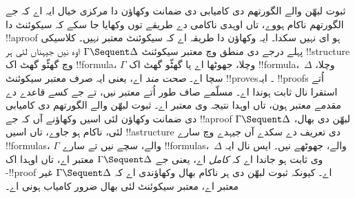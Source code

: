 \documentclass[../../../include/open-logic-section]{subfiles}
\begin{document}
ثبوت لبھّن والے الگورتھم دی کامیابی دی ضمانت وکھاؤن دا مرکزی خیال ایہ اے کہ جے الگورتھم ناکام ہووے، تاں اوہدی ناکامی دے طریقے توں وکھایا جا سکے کہ سیکوئنٹ دا !!a{proof} ہو ای نہیں سکدا۔ ایہ وکھاؤن دا طریقہ اے کہ سیکوئنٹ معتبر نہیں۔ کلاسیکی پہلے درجے دی منطق وچ معتبر سیکوئنٹ $ \Gamma \Sequent \Delta$ اوہ نیں جیہناں لئی ہر !!{structure} وچ گھٹّو گھٹ اک !!{formula}، $\Gamma$ وچلا، جھوٹھا اے یا گھٹّو گھٹ اک !!{formula}،~$\Delta$ وچلا، سچا اے۔  \emph{صحت مند} اے، یعنی ایہ صرف معتبر سیکوئنٹ !!{prove}s۔ ایہ !!{proof}s اُتے استقرا نال ثابت ہوندا اے۔ مسلّمے صاف طور اُتے معتبر نیں، تے جے کسے قاعدے دے مقدمے معتبر ہون، تاں اوہدا نتیجہ وی معتبر اے۔ ثبوت لبھّن والے الگورتھم دی کامیابی دی ضمانت وکھاؤن لئی اسیں وکھاؤنے آں کہ جے !!a{proof} لبھّن دی بھال، $\Gamma \Sequent \Delta$ لئی، ناکام ہو جاوے، تاں اسیں !!a{structure} دی تعریف دے سکدے آں جیہدے وچ سارے !!{formula}s، $\Gamma$ والے، سچے نیں تے سارے !!{formula}s،~$\Delta$ والے، جھوٹھے نیں۔ ایس نال ایہ وی ثابت ہو جاندا اے کہ  \emph{کامل} اے، یعنی جے $ \Gamma \Sequent \Delta$ معتبر اے، تاں اوہدا اک -!!{proof} اے۔ کیونکہ ثبوت لبھّن دی ہر ناکام بھال وکھاؤندی اے کہ $ \Gamma \Sequent \Delta$ غیر معتبر اے، معتبر سیکوئنٹ لئی بھال ضرور کامیاب ہونی اے۔
\end{document}
